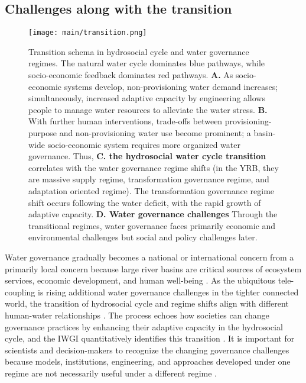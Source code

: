 \subsection{Challenges along with the transition}

\begin{figure*}[htbp!]
	\centering
	\texttt{[image: main/transition.png]}
	\caption{
		Transition schema in hydrosocial cycle and water governance regimes. The natural water cycle dominates blue pathways, while socio-economic feedback dominates red pathways.
		\textbf{A.} As socio-economic systems develop, non-provisioning water demand increases; simultaneously, increased adaptive capacity by engineering allows people to manage water resources to alleviate the water stress.
		\textbf{B.} With further human interventions, trade-offs between provisioning-purpose and non-provisioning water use become prominent; a basin-wide socio-economic system requires more organized water governance.
		Thus, \textbf{C. the hydrosocial water cycle transition} correlates with the water governance regime shifts (in the YRB, they are massive supply regime, transformation governance regime, and adaptation oriented regime). The transformation governance regime shift occurs following the water deficit, with the rapid growth of adaptive capacity.
		\textbf{D. Water governance challenges} Through the transitional regimes, water governance faces primarily economic and environmental challenges but social and policy challenges later.
	}
	\label{fig:summary}
\end{figure*}

Water governance gradually becomes a national or international concern from a primarily local concern because large river basins are critical sources of ecosystem services, economic development, and human well-being \cite{best2019, best2020}.
As the ubiquitous tele-coupling is rising additional water governance challenges in the tighter connected world, the transition of hydrosocial cycle and regime shifts align with different human-water relationships \cite{diaz2019}.
The process echoes how societies can change governance practices by enhancing their adaptive capacity in the hydrosocial cycle, and the IWGI quantitatively identifies this transition \cite{loch2020,turton1999}.
It is important for scientists and decision-makers to recognize the changing governance challenges because models, institutions, engineering, and approaches developed under one regime are not necessarily useful under a different regime \cite{reyers2018}.

